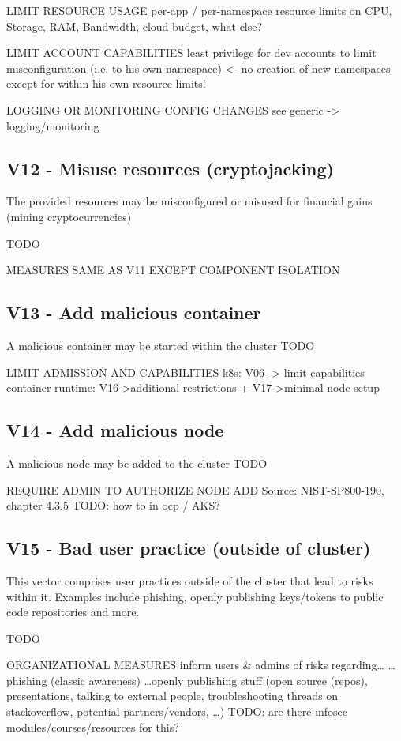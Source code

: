 LIMIT RESOURCE USAGE
	per-app / per-namespace resource limits on CPU, Storage, RAM, Bandwidth, cloud budget, what else?
	
LIMIT ACCOUNT CAPABILITIES
	least privilege for dev accounts to limit misconfiguration (i.e. to his own namespace) <- no creation of new namespaces except for within his own resource limits!
	
LOGGING OR MONITORING CONFIG CHANGES
	see generic -> logging/monitoring

\subsection{V12 - Misuse resources (cryptojacking)}
The provided resources may be misconfigured or misused for financial gains (mining cryptocurrencies)

TODO

MEASURES SAME AS V11 EXCEPT COMPONENT ISOLATION

\subsection{V13 - Add malicious container}
A malicious container may be started within the cluster
TODO

LIMIT ADMISSION AND CAPABILITIES
	k8s: V06 -> limit capabilities
	container runtime: V16->additional restrictions + V17->minimal node setup


\subsection{V14 - Add malicious node}
A malicious node may be added to the cluster
TODO

REQUIRE ADMIN TO AUTHORIZE NODE ADD
	Source: NIST-SP800-190, chapter 4.3.5      TODO: how to in ocp / AKS?


\subsection{V15 - Bad user practice (outside of cluster)}
This vector comprises user practices outside of the cluster that lead to risks within it. Examples include phishing, openly publishing keys/tokens to public code repositories and more.

TODO

ORGANIZATIONAL MEASURES
	inform users \& admins of risks regarding…	
		…phishing (classic awareness)
		…openly publishing stuff (open source (repos), presentations, talking to external people, troubleshooting threads on stackoverflow, potential partners/vendors, …) TODO: are there infosec modules/courses/resources for this?


